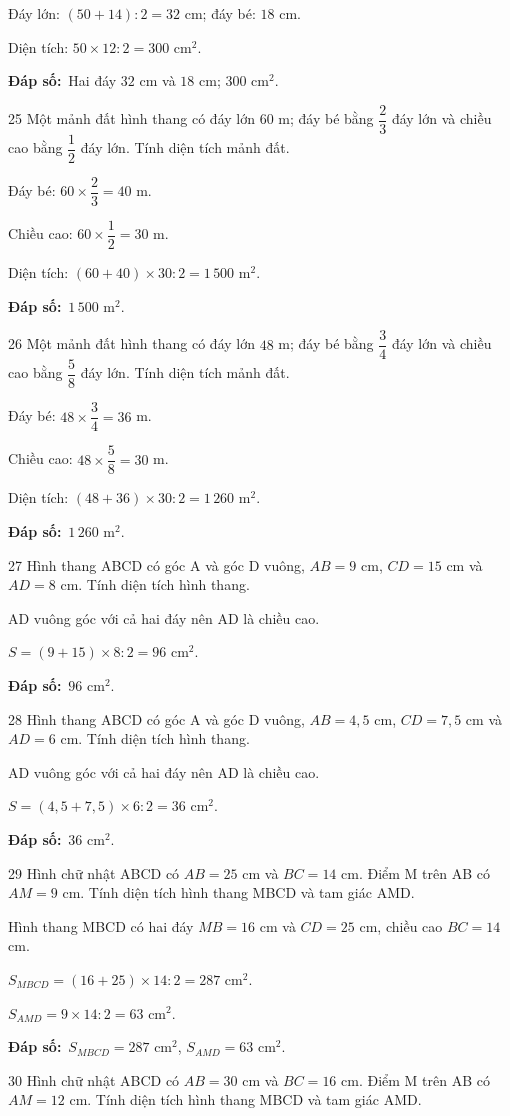 \documentclass[11pt]{article}
\newif\ifsol \solfalse
\providecommand{\AnsWord}{Đáp số}
\newcommand{\dapso}[1]{\par\textbf{\AnsWord:}\ #1}
\newcommand{\probsol}[1]{%
  \begin{lrbox}{\solmeasure}\begin{minipage}{\dimexpr\linewidth-24pt\relax}#1\end{minipage}\end{lrbox}%
  \ifsol
    \begin{solbox}#1\end{solbox}%
  \else
    \setlength{\solht}{\dimexpr\ht\solmeasure+\dp\solmeasure+0.85cm\relax}%
    \ifdim\solht<1.35cm\setlength{\solht}{1.35cm}\fi
    \begin{tcolorbox}[colback=white,colframe=Line,boxrule=0.8pt,arc=5pt,
      left=8pt,right=8pt,top=4pt,bottom=4pt,height=\solht]{\footnotesize\color{Slate}\itshape\WorkWord}\end{tcolorbox}%
  \fi}
\newcommand{\gap}{\vspace{0.3cm}}
\def\WorkWord{Bài làm:}
\def\AnsWord{Đáp số}
\begin{document}
\probsol{
Đáy lớn: $(50+14):2=32$ cm; đáy bé: $18$ cm.\par Diện tích: $50\times12:2=300$ cm$^2$.
\dapso{Hai đáy $32$ cm và $18$ cm; $300$ cm$^2$.}}
\gap
\begin{probbox}{25}{\relax}
Một mảnh đất hình thang có đáy lớn $60$ m; đáy bé bằng $\dfrac{2}{3}$ đáy lớn và chiều cao bằng $\dfrac{1}{2}$ đáy lớn. Tính diện tích mảnh đất.
\end{probbox}
\probsol{
Đáy bé: $60\times\dfrac{2}{3}=40$ m.\par Chiều cao: $60\times\dfrac{1}{2}=30$ m.\par Diện tích: $(60+40)\times30:2=1\,500$ m$^2$.
\dapso{$1\,500$ m$^2$.}}
\gap
\begin{probbox}{26}{\relax}
Một mảnh đất hình thang có đáy lớn $48$ m; đáy bé bằng $\dfrac{3}{4}$ đáy lớn và chiều cao bằng $\dfrac{5}{8}$ đáy lớn. Tính diện tích mảnh đất.
\end{probbox}
\probsol{
Đáy bé: $48\times\dfrac{3}{4}=36$ m.\par Chiều cao: $48\times\dfrac{5}{8}=30$ m.\par Diện tích: $(48+36)\times30:2=1\,260$ m$^2$.
\dapso{$1\,260$ m$^2$.}}
\gap
\begin{probbox}{27}{\relax}
Hình thang ABCD có góc A và góc D vuông, $AB=9$ cm, $CD=15$ cm và $AD=8$ cm. Tính diện tích hình thang.
\end{probbox}
\probsol{
AD vuông góc với cả hai đáy nên AD là chiều cao.\par $S=(9+15)\times8:2=96$ cm$^2$.
\dapso{$96$ cm$^2$.}}
\gap
\begin{probbox}{28}{\relax}
Hình thang ABCD có góc A và góc D vuông, $AB=4{,}5$ cm, $CD=7{,}5$ cm và $AD=6$ cm. Tính diện tích hình thang.
\end{probbox}
\probsol{
AD vuông góc với cả hai đáy nên AD là chiều cao.\par $S=(4{,}5+7{,}5)\times6:2=36$ cm$^2$.
\dapso{$36$ cm$^2$.}}
\gap
\begin{probbox}{29}{\relax}
Hình chữ nhật ABCD có $AB=25$ cm và $BC=14$ cm. Điểm M trên AB có $AM=9$ cm. Tính diện tích hình thang MBCD và tam giác AMD.
\end{probbox}
\probsol{
Hình thang MBCD có hai đáy $MB=16$ cm và $CD=25$ cm, chiều cao $BC=14$ cm.\par $S_{MBCD}=(16+25)\times14:2=287$ cm$^2$.\par $S_{AMD}=9\times14:2=63$ cm$^2$.
\dapso{$S_{MBCD}=287$ cm$^2$, $S_{AMD}=63$ cm$^2$.}}
\gap
\begin{probbox}{30}{\relax}
Hình chữ nhật ABCD có $AB=30$ cm và $BC=16$ cm. Điểm M trên AB có $AM=12$ cm. Tính diện tích hình thang MBCD và tam giác AMD.
\end{probbox}
\end{document}
